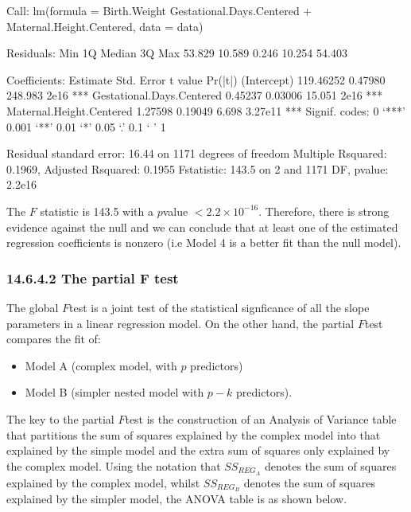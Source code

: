 \documentclass[letterpaper,10pt,english]{jupyterBook}
\begin{document}
\begin{sphinxVerbatim}[commandchars=\\\{\}]
Call:
lm(formula = Birth.Weight \PYGZti{} Gestational.Days.Centered + Maternal.Height.Centered, 
    data = data)

Residuals:
    Min      1Q  Median      3Q     Max 
\PYGZhy{}53.829 \PYGZhy{}10.589   0.246  10.254  54.403 

Coefficients:
                           Estimate Std. Error t value Pr(\PYGZgt{}|t|)    
(Intercept)               119.46252    0.47980 248.983  \PYGZlt{} 2e\PYGZhy{}16 ***
Gestational.Days.Centered   0.45237    0.03006  15.051  \PYGZlt{} 2e\PYGZhy{}16 ***
Maternal.Height.Centered    1.27598    0.19049   6.698 3.27e\PYGZhy{}11 ***
\PYGZhy{}\PYGZhy{}\PYGZhy{}
Signif. codes:  0 ‘***’ 0.001 ‘**’ 0.01 ‘*’ 0.05 ‘.’ 0.1 ‘ ’ 1

Residual standard error: 16.44 on 1171 degrees of freedom
Multiple R\PYGZhy{}squared:  0.1969,	Adjusted R\PYGZhy{}squared:  0.1955 
F\PYGZhy{}statistic: 143.5 on 2 and 1171 DF,  p\PYGZhy{}value: \PYGZlt{} 2.2e\PYGZhy{}16
\end{sphinxVerbatim}

\sphinxAtStartPar
The \(F\) statistic is 143.5 with a \(p\)\sphinxhyphen{}value \(<2.2 \times 10^{-16}\). Therefore, there is strong evidence against the null and we can conclude that at least one of the estimated regression coefficients is non\sphinxhyphen{}zero (i.e Model 4 is a better fit than the null model).


\subsubsection{14.6.4.2 The partial F test}
\label{\detokenize{14.g. Linear Regression III:the-partial-f-test}}
\sphinxAtStartPar
The global \(F\)\sphinxhyphen{}test is a joint test of the statistical signficance of all the slope parameters in a linear regression model. On the other hand, the partial \(F\)\sphinxhyphen{}test compares the fit of:
\begin{itemize}
\item {} 
\sphinxAtStartPar
Model A (complex model, with  \(p\) predictors)

\item {} 
\sphinxAtStartPar
Model B (simpler nested model with \(p-k\) predictors).

\end{itemize}

\sphinxAtStartPar
The key to the partial \(F\)\sphinxhyphen{}test is the construction of an Analysis of Variance table that partitions the sum of squares explained by the complex model into that explained by the simple model and the extra sum of squares only explained by the complex model. Using the notation that \(SS_{REG_A}\) denotes the sum of squares explained by the complex model, whilst \(SS_{REG_B}\) denotes the sum of squares explained by the simpler model, the ANOVA table is as shown below.
\end{document}
